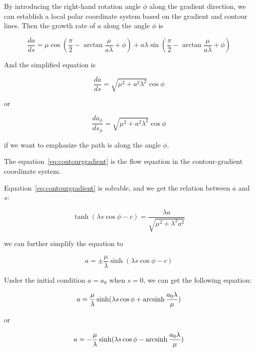By introducing the right-hand rotation angle $\phi$ along the gradient direction, we can establish a local polar coordinate system based on the gradient and contour lines.
Then the growth rate of $a$ along the angle $\phi$ is

\begin{equation}
    \frac{da}{ds} = \mu \cos (\frac{\pi}{2} - \arctan \frac{\mu}{a \lambda} + \phi) + a \lambda \sin (\frac{\pi}{2} - \arctan \frac{\mu}{a \lambda} + \phi)
    \label{eq:fourfold}
\end{equation}

And the simplified equation is

\begin{equation}
    \frac{da}{ds} = \sqrt {\mu^2 + a^2 \lambda^2} \cos \phi\label{eq:contourgradient}
\end{equation}

or

\begin{equation}
    \frac{da_{\phi}}{ds_{\phi}} = \sqrt {\mu^2 + a^2 \lambda^2} \cos \phi\label{eq:contourgradient2}
\end{equation}

if we want to emphasize the path is along the angle $\phi$.

The equation~\eqref{eq:contourgradient} is the flow equation in the contour-gradient coordinate system.

Equation~\eqref{eq:contourgradient} is solvable, and we get the relation between $a$ and $s$:

\begin{equation}\label{eq:rel_a_s}
    \tanh(\lambda s \cos \phi - c) = \frac{\lambda a}{\sqrt{\mu^2 + \lambda^2 a^2}}
\end{equation}

we can further simplify the equation to

\begin{equation}
  a = \pm \frac{\mu}{\lambda} \sinh(\lambda s \cos \phi - c)\label{eq:gradevo}
\end{equation}

Under the initial condition $a = a_0$ when $s = 0$, we can get the following equation:

\begin{equation}
    a = \frac{\mu}{\lambda} \sinh(\lambda s \cos \phi + \operatorname{arcsinh} \frac{a_0 \lambda}{\mu})\label{eq:gradevo2}
\end{equation}

or

\begin{equation}
    a = - \frac{\mu}{\lambda} \sinh(\lambda s \cos \phi - \operatorname{arcsinh} \frac{a_0 \lambda}{\mu})\label{eq:gradevo3}
\end{equation}


